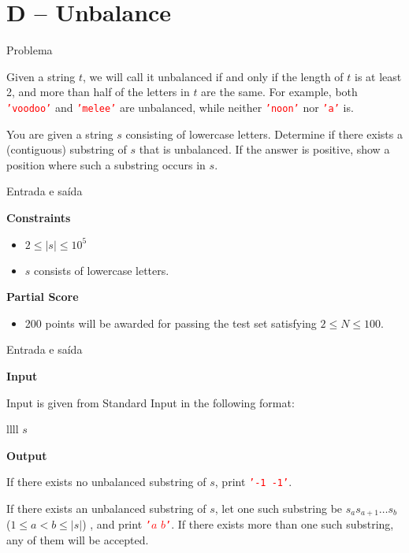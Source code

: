 \section{D -- Unbalance}

\begin{frame}[fragile]{Problema}

Given a string $t$, we will call it unbalanced if and only if the length of $t$ is at least 2, and
more than half of the letters in $t$ are the same. For example, both
\texttt{\textcolor{red}{'voodoo'}} and \texttt{\textcolor{red}{'melee'}} are unbalanced, while
neither \texttt{\textcolor{red}{'noon'}} nor \texttt{\textcolor{red}{'a'}} is.

You are given a string $s$ consisting of lowercase letters. Determine if there exists a
(contiguous) substring of $s$ that is unbalanced. If the answer is positive, show a position where
such a substring occurs in $s$.

\end{frame}

\begin{frame}[fragile]{Entrada e saída}

\textbf{Constraints}

\begin{itemize}
    \item $2\leq |s| \leq 10^5$
    \item $s$ consists of lowercase letters.
\end{itemize}

\vspace{0.1in}

\textbf{Partial Score}

\begin{itemize}
    \item 200 points will be awarded for passing the test set satisfying $2 \leq N\leq 100$.
\end{itemize}

\end{frame}

\begin{frame}[fragile]{Entrada e saída}

\textbf{Input}

Input is given from Standard Input in the following format:
\begin{atcoderio}{llll}
$s$ \\
\end{atcoderio}

\textbf{Output}

If there exists no unbalanced substring of $s$, print \texttt{\textcolor{red}{'-1 -1'}}.

If there exists an unbalanced substring of $s$, let one such substring be $s_as_{a+1}\ldots s_b$
($1\leq a < b \leq |s|$) , and print {\textcolor{red}{\texttt{'}$a$ $b$\texttt{'}}}. If there exists more than one
such substring, any of them will be accepted.

\end{frame}

